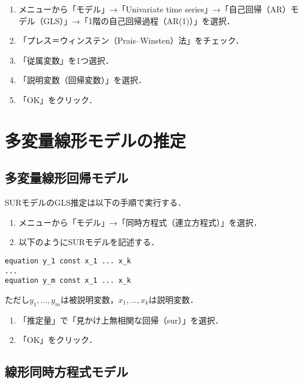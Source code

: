 \documentclass[
]{jlreq}
\providecommand{\tightlist}{%
  \setlength{\itemsep}{0pt}\setlength{\parskip}{0pt}}
\begin{document}
\begin{enumerate}
\def\labelenumi{\arabic{enumi}.}
\tightlist
\item
  メニューから「モデル」→「Univariate time series」→「自己回帰（AR）モデル（GLS）」→「1階の自己回帰過程（AR(1)）」を選択．
\item
  「プレス＝ウィンステン（Prais--Winsten）法」をチェック．
\item
  「従属変数」を1つ選択．
\item
  「説明変数（回帰変数）」を選択．
\item
  「OK」をクリック．
\end{enumerate}

\section{多変量線形モデルの推定}\label{ux591aux5909ux91cfux7ddaux5f62ux30e2ux30c7ux30ebux306eux63a8ux5b9a}

\subsection{多変量線形回帰モデル}\label{ux591aux5909ux91cfux7ddaux5f62ux56deux5e30ux30e2ux30c7ux30eb}

SURモデルのGLS推定は以下の手順で実行する．

\begin{enumerate}
\def\labelenumi{\arabic{enumi}.}
\tightlist
\item
  メニューから「モデル」→「同時方程式（連立方程式）」を選択．
\item
  以下のようにSURモデルを記述する．
\end{enumerate}

\begin{verbatim}
equation y_1 const x_1 ... x_k
...
equation y_m const x_1 ... x_k
\end{verbatim}

ただし\(y_1,\dots,y_m\)は被説明変数，\(x_1,\dots,x_k\)は説明変数．

\begin{enumerate}
\def\labelenumi{\arabic{enumi}.}
\setcounter{enumi}{2}
\tightlist
\item
  「推定量」で「見かけ上無相関な回帰（sur）」を選択．
\item
  「OK」をクリック．
\end{enumerate}

\subsection{線形同時方程式モデル}\label{ux7ddaux5f62ux540cux6642ux65b9ux7a0bux5f0fux30e2ux30c7ux30eb}
\end{document}

